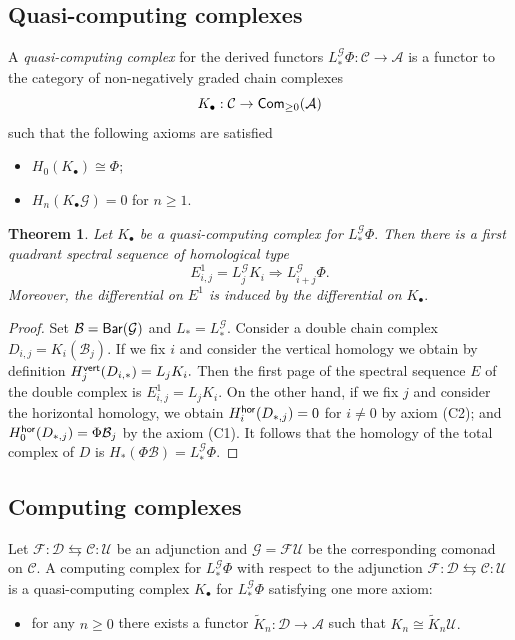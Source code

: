 \documentclass{amsart}
\numberwithin{equation}{section}
\newtheorem{theorem}{Theorem}[section]
\theoremstyle{definition}
\def\CC{\mathcal{C}}
\def\FF{\mathcal{F}}
\def\GG{\mathcal{G}}
\def\UU{\mathcal{U}}
\def\DD{\mathcal{D}}
\def\BB{\mathcal{B}}
\def\AA{\mathcal{A}}
\begin{document}
\subsection{Quasi-computing complexes}
A {\it quasi-computing complex} for the derived functors $L_*^{\GG}\Phi:\CC\to \AA$ is a functor to the category of non-negatively graded chain complexes
$$K_\bullet : \CC\to  {\sf Com}_{\geq 0}(\AA)$$
such that the following axioms are satisfied
\begin{itemize}
\item[(C1)]  $H_0(K_\bullet)\cong \Phi;$
\item[(C2)] $H_n(K_\bullet \GG )=0$ for $n\geq 1.$
\end{itemize}



\begin{theorem}\label{th_quasicomputing}
Let $K_\bullet$ be a quasi-computing complex for  $L_*^\GG\Phi.$ Then there is a first quadrant spectral sequence of homological type  
$$E^{1}_{i,j}=L^{\GG}_jK_i \Rightarrow L_{i+j}^{\GG}  \Phi.$$
Moreover, the differential on $E^1$ is induced by the differential on $K_\bullet.$
\end{theorem}
\begin{proof} Set $\BB={\sf Bar}(\GG)$ and $L_*=L^\GG_*.$ 
Consider a double chain complex $D_{i,j}=K_i(\BB_j).$ If we fix $i$ and consider the vertical homology we obtain by definition $H^{\sf vert}_j(D_{i,*})=L_jK_i.$ Then the first page of the spectral sequence $E$ of the double complex is $E^1_{i,j}=L_jK_i.$ 
On the other hand, if we fix $j$ and consider the horizontal homology,  we obtain $H^{\sf hor}_i(D_{*,j})=0$ for $ i\ne 0$ by axiom (C2);  and $H^{\sf hor}_0(D_{*,j})=\Phi\BB_j$ by the  axiom (C1). It follows that  the homology of the total complex of $D$ is $H_*(\Phi\BB )=L_*^\GG \Phi.$ 
\end{proof}

\subsection{Computing complexes}
Let $\FF:\DD\leftrightarrows \CC: \UU$ be an adjunction and $\GG=\FF\UU$ be the corresponding comonad on $\CC$. A computing complex for $L^\GG_*\Phi$  with respect to the adjunction $\FF:\DD\leftrightarrows \CC: \UU $ is a quasi-computing complex $K_\bullet$ for $L^\GG_*\Phi$  satisfying one more axiom: 
\begin{itemize}
\item[(C3)] for any $n\geq 0$ there exists a functor $\tilde K_n:\DD\to \AA$ such that  $K_n\cong \tilde K_n \UU.$
\end{itemize}
\end{document}
